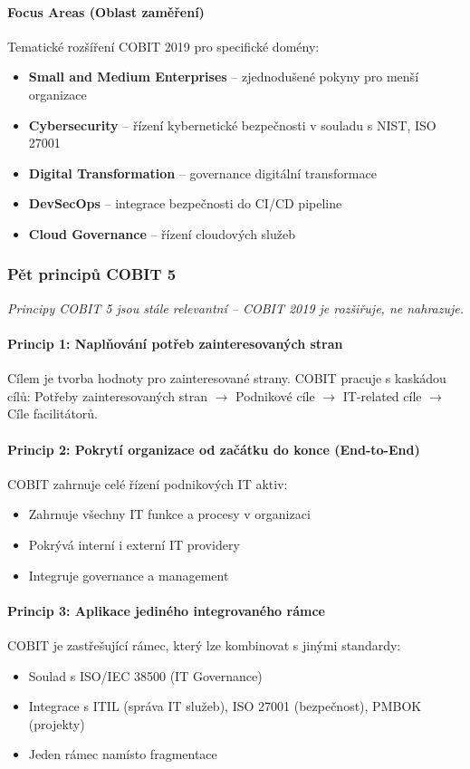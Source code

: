\paragraph{Focus Areas (Oblast zaměření)}
Tematické rozšíření COBIT 2019 pro specifické domény:
\begin{itemize}
  \item \textbf{Small and Medium Enterprises} -- zjednodušené pokyny pro menší organizace
  \item \textbf{Cybersecurity} -- řízení kybernetické bezpečnosti v souladu s NIST, ISO 27001
  \item \textbf{Digital Transformation} -- governance digitální transformace
  \item \textbf{DevSecOps} -- integrace bezpečnosti do CI/CD pipeline
  \item \textbf{Cloud Governance} -- řízení cloudových služeb
\end{itemize}

\subsubsection{Pět principů COBIT 5}

\textit{Principy COBIT 5 jsou stále relevantní -- COBIT 2019 je rozšiřuje, ne nahrazuje.}

\paragraph{Princip 1: Naplňování potřeb zainteresovaných stran}
Cílem je tvorba hodnoty pro zainteresované strany. COBIT pracuje s kaskádou cílů:
Potřeby zainteresovaných stran $\to$ Podnikové cíle $\to$ IT-related cíle $\to$ Cíle facilitátorů.

\paragraph{Princip 2: Pokrytí organizace od začátku do konce (End-to-End)}
COBIT zahrnuje celé řízení podnikových IT aktiv:
\begin{itemize}
  \item Zahrnuje všechny IT funkce a procesy v organizaci
  \item Pokrývá interní i externí IT providery
  \item Integruje governance a management
\end{itemize}

\paragraph{Princip 3: Aplikace jediného integrovaného rámce}
COBIT je zastřešující rámec, který lze kombinovat s jinými standardy:
\begin{itemize}
  \item Soulad s ISO/IEC 38500 (IT Governance)
  \item Integrace s ITIL (správa IT služeb), ISO 27001 (bezpečnost), PMBOK (projekty)
  \item Jeden rámec namísto fragmentace
\end{itemize}

